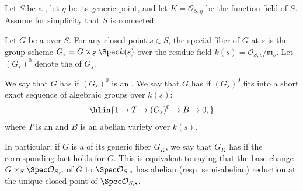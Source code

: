 \begin{definition} \label{definition:abelian_and_semi_abelian_reduction_for_a_smooth_group_scheme_over_a_dedekind_scheme}
    Let $S$ be a , let $\eta$ be its generic point, and let $K = \mathcal{O}_{S, \eta}$ be the function field of $S$. Assume for simplicity that $S$ is connected.

    Let $G$ be a   over $S$. For any closed point $s \in S$, the special fiber of $G$ at $s$ is the group scheme $G_s = G \times_S \Spec k(s)$ over the residue field $k(s) = \mathcal{O}_{S, s} / \mathfrak{m}_s$. Let $(G_s)^0$ denote the  of $G_s$.

    We say that $G$ has  if $(G_s)^0$ is an . We say that $G$ has  if $(G_s)^0$ fits into a short exact sequence of algebraic groups over $k(s)$:
    $$\hlin{1 \to T \to (G_s)^0 \to B \to 0,}$$
    where $T$ is an  and $B$ is an abelian variety over $k(s)$.

    In particular, if $G$ is a  of its generic fiber $G_K$, we say that $G_K$ has  if the corresponding fact holds for $G$. This is equivalent to saying that the base change $G \times_S \Spec \mathcal{O}_{S, s}$ of $G$ to $\Spec \mathcal{O}_{S, s}$ has abelian (resp. semi-abelian) reduction at the unique closed point of $\Spec \mathcal{O}_{S, s}$.
\end{definition}
